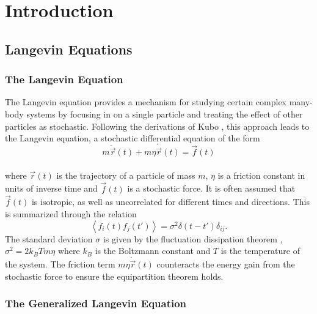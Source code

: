 \chapter{Introduction}

\section{Langevin Equations}

\subsection{The Langevin Equation} \label{sec:langevin_equation}

The Langevin equation provides a mechanism for studying certain complex many-body systems by focusing in on a single particle and treating the effect of other particles as stochastic. Following the derivations of Kubo \cite{Kubo}, this approach leads to the Langevin equation, a stochastic differential equation of the form 
\\
$$
m\ddot{\vec{r}}(t) + m \eta \dot{\vec{r}}(t) = \vec{f}(t)
$$
\\
where $\vec{r}(t)$ is the trajectory of a particle of mass $m$, $\eta$ is a friction constant in units of inverse time and $\vec{f}(t)$ is a stochastic force. It is often assumed that $\vec{f}(t)$ is isotropic, as well as uncorrelated for different times and directions. This is summarized through the relation 
\begin{equation}
\left<f_i(t)f_j(t')\right>=\sigma^2\delta(t-t')\delta_{ij} \label{eq:tdomain_corr}.
\end{equation}
The standard deviation $\sigma$ is given by the fluctuation dissipation theorem \cite{Kubo}, $\sigma^2=2k_BTm\eta$ where $k_B$ is the Boltzmann constant and $T$ is the temperature of the system. The friction term $m \eta \dot{\vec{r}}(t)$ counteracts the energy gain from the stochastic force to ensure the equipartition theorem holds. 

\subsection{The Generalized Langevin Equation}

